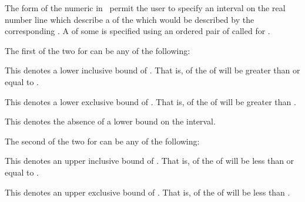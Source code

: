 \endcode
{}

\endsubsubsection%

\endsubsection%


The  form of the numeric 
in \thenextfigure\ permit the user to specify an interval on the real number line
which describe a  of the  which would be described by the
corresponding .  A  of some 
 is specified using an ordered pair of  called
 for  .

The first of the two  for   can be
any of the following:

\beginlist


This denotes a lower inclusive bound of .  That is, 
of the  of  will be greater than or equal to .


This denotes a lower exclusive bound of .  That is, 
of the  of  will be greater than .


This denotes the absence of a lower bound on the interval.

\endlist

The second of the two  for   can be
any of the following:

\beginlist


This denotes an upper inclusive bound of .  That is, 
of the  of  will be less than or equal to .


This denotes an upper exclusive bound of .  That is, 
of the  of  will be less than .

